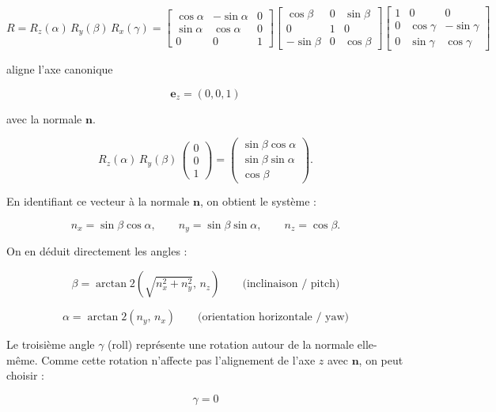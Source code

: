 \documentclass[a4paper,11pt]{article}
\begin{document}
\[
R = R_z(\alpha)\, R_y(\beta)\, R_x(\gamma)
=
\begin{bmatrix}
\cos\alpha & -\sin\alpha & 0 \\
\sin\alpha &  \cos\alpha & 0 \\
0          &  0          & 1
\end{bmatrix}
\begin{bmatrix}
\cos\beta & 0 & \sin\beta \\
0         & 1 & 0         \\
-\sin\beta & 0 & \cos\beta
\end{bmatrix}
\begin{bmatrix}
1 & 0          & 0           \\
0 & \cos\gamma & -\sin\gamma \\
0 & \sin\gamma &  \cos\gamma
\end{bmatrix}
\]

\newpage

aligne l'axe canonique

\[
\mathbf{e}_z = (0,0,1)
\]

avec la normale \(\mathbf{n}\).

\[
R_z(\alpha)\, R_y(\beta)\,
\begin{pmatrix}
0 \\ 0 \\ 1
\end{pmatrix}
=
\begin{pmatrix}
\sin\beta \cos\alpha \\
\sin\beta \sin\alpha \\
\cos\beta
\end{pmatrix}.
\]

En identifiant ce vecteur à la normale \(\mathbf{n}\), on obtient le système :

\[
n_x = \sin\beta \cos\alpha,
\qquad
n_y = \sin\beta \sin\alpha,
\qquad
n_z = \cos\beta.
\]

On en déduit directement les angles :

\[
\beta = \arctan2\!\left(\sqrt{n_x^2 + n_y^2},\, n_z\right)
\qquad\text{(inclinaison / pitch)}
\]

\[
\alpha = \arctan2(n_y,\, n_x)
\qquad\text{(orientation horizontale / yaw)}
\]

Le troisième angle \(\gamma\) (roll) représente une rotation autour de la normale elle-même.  
Comme cette rotation n'affecte pas l'alignement de l'axe \(z\) avec \(\mathbf{n}\), on peut choisir :

\[
\gamma = 0
\]
\end{document}
